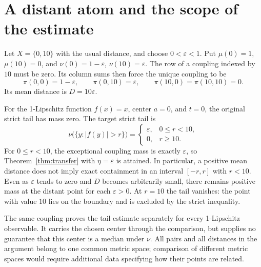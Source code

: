 \documentclass[a4paper,11pt]{article}
\begin{document}
\section{A distant atom and the scope of the estimate}

Let $X=\{0,10\}$ with the usual distance, and choose $0<\varepsilon<1$.
Put $\mu(0)=1$, $\mu(10)=0$, and
$\nu(0)=1-\varepsilon$, $\nu(10)=\varepsilon$.
The row of a coupling indexed by $10$ must be zero. Its column sums
then force the unique coupling to be
\[
 \pi(0,0)=1-\varepsilon,\qquad
 \pi(0,10)=\varepsilon,\qquad
 \pi(10,0)=\pi(10,10)=0.
\]
Its mean distance is $D=10\varepsilon$.

For the 1-Lipschitz function $f(x)=x$, center $a=0$, and $t=0$, the
original strict tail has mass zero. The target strict tail is
\[
 \nu\bigl(\{y:|f(y)|>r\}\bigr)
 =\begin{cases}
   \varepsilon,&0\le r<10,\\
   0,&r\ge10.
  \end{cases}
\]
For $0\le r<10$, the exceptional coupling mass is exactly
$\varepsilon$, so Theorem~\ref{thm:transfer} with
$\eta=\varepsilon$ is attained. In particular, a positive mean distance
does not imply exact containment in an interval $[-r,r]$ with $r<10$.
Even as $\varepsilon$ tends to zero and $D$ becomes arbitrarily small,
there remains positive mass at the distant point for each
$\varepsilon>0$. At $r=10$ the tail vanishes: the point with value $10$
lies on the boundary and is excluded by the strict inequality.

The same coupling proves the tail estimate separately for every
1-Lipschitz observable. It carries the chosen center through the
comparison, but supplies no guarantee that this center is a median
under $\nu$. All pairs and all distances in the argument belong to one
common metric space; comparison of different metric spaces would
require additional data specifying how their points are related.
\end{document}
